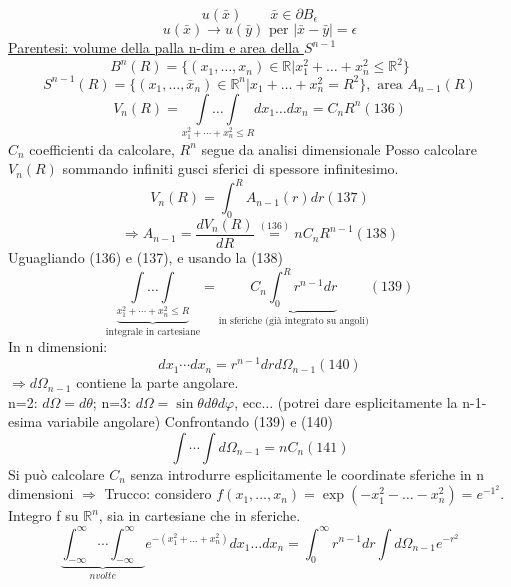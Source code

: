 \documentclass[a4paper,11pt]{report}
\newcommand{\R}{\mathbb{R}}
\newcommand{\Rn}{\mathbb{R}^n}
\newcommand{\x}{\bar{x}}
\newcommand{\y}{\bar{y}}
\begin{document}
$$
u(\x) \qquad \x \in \partial B_\epsilon
$$
$$
u(\x)\to u(\y) \text{ per } |\x - \y|=\epsilon
$$
\underline{Parentesi: volume della palla n-dim e area della $S^{n-1}$}
$$
B^n(R)=\{(x_1,\dots,x_n)\in \R |x_1^2 + \dots + x_n^2\leq \R^2\}
$$
$$
S^{n-1}(R)=\{(x_1,\dots,\x_n)\in\Rn | x_1 + \dots + x_n^2=R^2 \}, \text{ area $A_{n-1}(R)$}
$$
\begin{equation}
V_n(R)=\underset{x_1^2 + \cdots + x_n^2 \leq R}{\int \dots \int} dx_1\dots dx_n = C_n R^n (136)
\end{equation}
$C_n$ coefficienti da calcolare, $R^n$ segue da analisi dimensionale
Posso calcolare $V_n(R)$ sommando infiniti gusci sferici di spessore infinitesimo.
\begin{equation}
V_n(R)=\int_0^R A_{n-1}(r)dr (137)
\end{equation}
\begin{equation}
\Rightarrow A_{n-1}=\dfrac{dV_n(R)}{dR}\overset{(136)}{=} nC_n R^{n-1}(138)
\end{equation}
Uguagliando (136) e (137), e usando la (138)
\begin{equation}
\underset{\text{integrale in cartesiane}}{\underbrace{\underset{x_1^2 + \cdots + x_n^2 \leq R}{\int \dots \int}}}=\underset{\text{in sferiche (già integrato su angoli)}}{\underbrace{C_n \int_0^R r^{n-1}dr}} (139)
\end{equation}
In n dimensioni: 
\begin{equation}
dx_1 \cdots dx_n=r^{n-1}drd\Omega_{n-1} (140)
\end{equation}
$ \Rightarrow d\Omega_{n-1} $ contiene la parte angolare.\\
n=2: $d\Omega=d\theta$; n=3: $d\Omega=\sin\theta d\theta d\varphi$, ecc$\dots$ (potrei dare esplicitamente la n-1-esima variabile angolare)
Confrontando (139) e (140)
\begin{equation}
\int \cdots \int d\Omega_{n-1}=nC_n (141)
\end{equation}
Si può calcolare $C_n$ senza introdurre esplicitamente le coordinate sferiche in n dimensioni $\Rightarrow$ Trucco: considero $f(x_1,\dots,x_n)=\exp(-x_1^2 - \dots - x_n^2)=e^{-1^2}$. Integro f su $\Rn$, sia in cartesiane che in sferiche.
$$
\underset{n volte}{\underbrace{\int_{-\infty}^\infty \cdots \int_{-\infty}^{\infty}}} e^{-(x_1^2 + \dots + x_n^2)}dx_1 \dots dx_n = \int_0^{\infty}r^{n-1}dr\int d\Omega_{n-1}e^{-r^2}
$$
\end{document}
